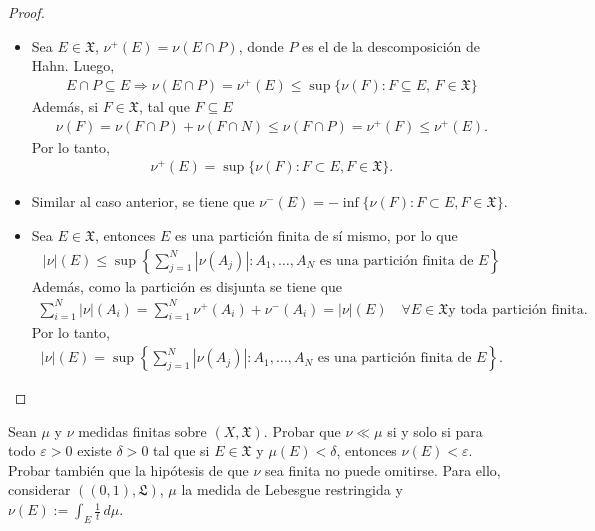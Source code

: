 \documentclass[12pt]{article}
\newenvironment{statement}[2][Ejercicio]{\begin{trivlist}
\item[\hskip \labelsep {\bfseries #1}\hskip \labelsep {\bfseries #2.}]}{\end{trivlist}}
\begin{document}
\begin{proof}
    \begin{itemize}
        \item[(a)] Sea \(E \in \mathfrak{X} \), \(\nu^+(E) = \nu(E \cap P) \), donde \(P \) es el de la descomposición de Hahn. Luego, \begin{align*}
                  E \cap P \subseteq E \Rightarrow \nu(E \cap P) = \nu^+(E) \leq \sup \{ \nu(F) : F \subseteq E \text{, } F \in \mathfrak{X} \}
              \end{align*} Además, si \(F \in \mathfrak{X} \), tal que \(F \subseteq E \) \begin{align*}
                  \nu(F) = \nu(F \cap P) + \nu(F \cap N) \leq \nu(F \cap P) = \nu^+(F) \leq \nu^+(E).
              \end{align*} Por lo tanto, \begin{align*}
                  \nu^+(E) = \sup\{\nu(F) : F \subset E, F \in \mathfrak{X}\}.
              \end{align*}
        \item[(b)] Similar al caso anterior, se tiene que \(\nu^-(E) = -\inf\{\nu(F) : F \subset E, F \in \mathfrak{X}\} \).
        \item[(c)] Sea \(E \in \mathfrak{X} \), entonces \(E \) es una partición finita de sí mismo, por lo que \begin{align*}
                  |\nu|(E) \leq \sup\left\{\sum_{j=1}^{N} |\nu(A_j)| : A_1, \ldots, A_N \text{ es una partición finita de } E \right\}
              \end{align*} Además, como la partición es disjunta se tiene que \begin{align*}
                  \sum_{i = 1}^N|\nu|(A_i) = \sum_{i = 1}^N \nu^+(A_i) + \nu^-(A_i) = |\nu|(E) \quad \forall E \in \mathfrak{X} \text{y toda partición finita}.
              \end{align*} Por lo tanto, \begin{align*}
                  |\nu|(E) = \sup\left\{\sum_{j=1}^{N} |\nu(A_j)| : A_1, \ldots, A_N \text{ es una partición finita de } E \right\}.
              \end{align*}
    \end{itemize}
\end{proof}

\begin{statement}{2}
    Sean \(\mu \) y \(\nu \) medidas finitas sobre \((X, \mathfrak{X}) \). Probar que \(\nu \ll \mu \) si y solo si para todo \(\varepsilon > 0 \) existe \(\delta > 0 \) tal que si \(E \in \mathfrak{X} \) y \(\mu(E) < \delta \), entonces \(\nu(E) < \varepsilon \). \\
    Probar también que la hipótesis de que \(\nu \) sea finita no puede omitirse. Para ello, considerar \(((0,1), \mathfrak{L}) \), \(\mu \) la medida de Lebesgue restringida y \(\nu(E) := \int_E \frac{1}{t} \, d\mu \).
\end{statement}
\end{document}
